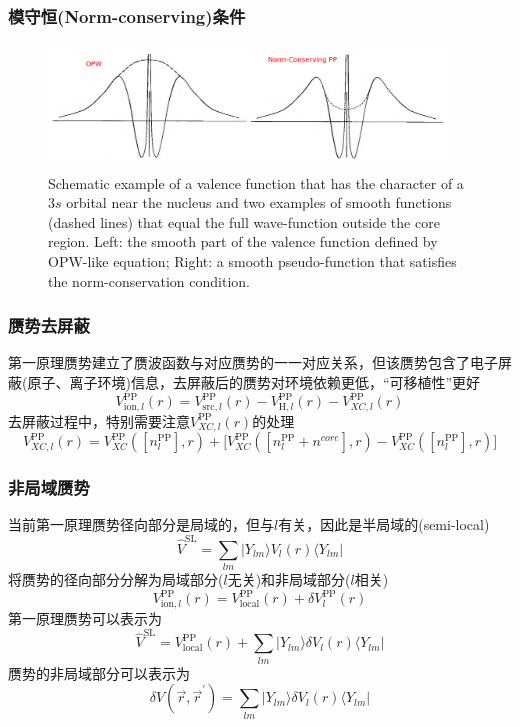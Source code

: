 \frame
{
	\frametitle{模守恒\textrm{(Norm-conserving)}条件}
\begin{figure}[h!]
\centering
\vspace*{-0.10in}
\includegraphics[height=1.30in,width=4.17in,viewport=0 0 1150 350,clip]{Figures/Pseudo-OPW_NCPP.png}
\caption{\tiny \textrm{Schematic example of a valence function that has the character of a $3s$ orbital near the nucleus and two examples of smooth functions (dashed lines) that equal the full wave-function outside the core region. Left: the smooth part of the valence function defined by OPW-like equation; Right: a smooth pseudo-function that satisfies the norm-conservation condition.}}%
\label{Pseudo-OPW_NCPP}
\end{figure}
}

\frame
{
	\frametitle{赝势去屏蔽}
	第一原理赝势建立了赝波函数与对应赝势的一一对应关系，但该赝势包含了电子屏蔽(原子、离子环境)信息，去屏蔽后的赝势对环境依赖更低，“可移植性”更好
	$$V_{\mathrm{ion},l}^{\mathrm{PP}}(r)=V_{\mathrm{src},l}^{\mathrm{PP}}(r)-V_{\mathrm{H},l}^{\mathrm{PP}}(r)-V_{XC,l}^{\mathrm{PP}}(r)$$
	去屏蔽过程中，特别需要注意$V_{XC,l}^{\mathrm{PP}}(r)$的处理
	$$V_{XC,l}^{\mathrm{PP}}(r)=V_{XC}^{\mathrm{PP}}([n_l^{\mathrm{PP}}],r)+\big[V_{XC}^{\mathrm{PP}}([n_l^{\mathrm{PP}}+n^{core}],r)-V_{XC}^{\mathrm{PP}}([n_l^{\mathrm{PP}}],r)\big]$$
}

\frame
{
	\frametitle{非局域赝势}
	当前第一原理赝势径向部分是局域的，但与$l$有关，因此是半局域的(\textrm{semi-local})
	\begin{displaymath}
		\hat{V}^{\mathrm{SL}}=\sum_{lm}|Y_{lm}\rangle V_l(r)\langle Y_{lm}|
	\end{displaymath}
	将赝势的径向部分分解为局域部分($l$无关)和非局域部分($l$相关)
	\begin{displaymath}
		V_{\mathrm{ion},l}^{\mathrm{PP}}(r)=V_{\mathrm{local}}^{\mathrm{PP}}(r)+\delta V_l^{\mathrm{PP}}(r)
	\end{displaymath}
	第一原理赝势可以表示为
	\begin{displaymath}
		\hat{V}^{\mathrm{SL}}=V_{\mathrm{local}}^{\mathrm{PP}}(r)+\sum_{lm}|Y_{lm}\rangle\delta V_l(r)\langle Y_{lm}|
	\end{displaymath}
	赝势的非局域部分可以表示为
	\begin{displaymath}
		\delta V(\vec r,\vec r^{\prime})=\sum_{lm}|Y_{lm}\rangle\delta V_l(r)\langle Y_{lm}|
	\end{displaymath}
}

